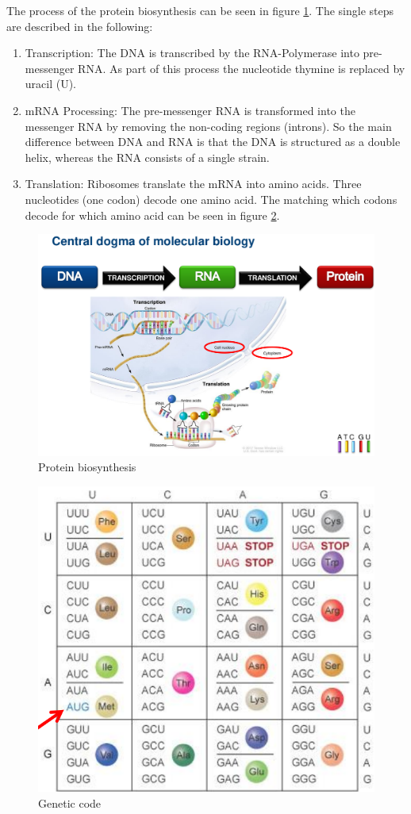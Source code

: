 The process of the protein biosynthesis can be seen in figure \ref{protein_biosynthesis}. The single steps are described in the following:
\begin{enumerate}
	\item Transcription: The \ac{DNA} is transcribed by the RNA-Polymerase into pre-messenger RNA. As part of this process the nucleotide thymine is replaced by uracil (U). \cite[p. 9]{schererStatisticalGeneticsGenetic2021}
	\item mRNA Processing: The pre-messenger RNA is transformed into the messenger RNA by removing the non-coding regions (introns). So the main difference between \ac{DNA} and \ac{RNA} is that the \ac{DNA} is structured as a double helix, whereas the \ac{RNA} consists of a single strain. \cite[p. 9]{schererStatisticalGeneticsGenetic2021}
	\item Translation: Ribosomes translate the mRNA into amino acids. Three nucleotides (one codon) decode one amino acid. The matching which codons decode for which amino acid can be seen in figure \ref{genetic_code}. \cite[p. 9]{schererStatisticalGeneticsGenetic2021}
\end{enumerate}

\begin{figure}[ht]
	\centering
	\includegraphics[width=1.0\linewidth]{figures/dogmaMolecularBiology.png}
	\caption{Protein biosynthesis \cite{schererStatisticalGeneticsGenetic2021}}
	\label{protein_biosynthesis}
\end{figure}

\begin{figure}[ht]
	\centering
	\includegraphics[width=0.4\linewidth]{figures/geneticCode.png}
	\caption{Genetic code \cite{schererStatisticalGeneticsGenetic2021}}
	\label{genetic_code}
\end{figure}

